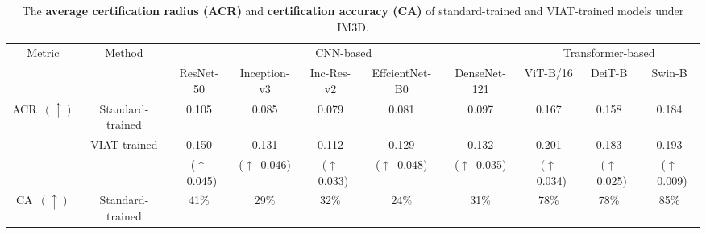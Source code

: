 \documentclass[10pt,journal,compsoc]{IEEEtran}
\begin{document}
\begin{table}[t]
\caption{The \textbf{average certification radius (ACR)} and \textbf{certification accuracy (CA)} of standard-trained and VIAT-trained models under IM3D.}
\setlength\tabcolsep{5.3pt}
\renewcommand\arraystretch{1.2}
\centering
\begin{tabular}{c|c|ccccc|ccc}
\hline
\multirow{2}{*}{Metric} & \multirow{2}{*}{Method}       & \multicolumn{5}{c|}{CNN-based}                                                                                                                                     & \multicolumn{3}{c}{Transformer-based}                                \\ \cline{3-10} 
                        &                               & \multicolumn{1}{c|}{ResNet-50} & \multicolumn{1}{c|}{Inception-v3} & \multicolumn{1}{c|}{Inc-Res-v2} & \multicolumn{1}{c|}{EffcientNet-B0} & DenseNet-121 & \multicolumn{1}{c|}{ViT-B/16} & \multicolumn{1}{c|}{DeiT-B} & Swin-B \\ \hline\hline
\multirow{3}{*}{ACR~$(\uparrow)$}    & Standard-trained              & \multicolumn{1}{c|}{0.105}          & \multicolumn{1}{c|}{0.085}             & \multicolumn{1}{c|}{0.079}                    & \multicolumn{1}{c|}{0.081}               & 0.097             & \multicolumn{1}{c|}{0.167}         & \multicolumn{1}{c|}{0.158}       & 0.184        \\ \cline{2-10} 
                        & \multirow{2}{*}{VIAT-trained} & \multicolumn{1}{c|}{0.150}          & \multicolumn{1}{c|}{0.131}             & \multicolumn{1}{c|}{0.112}                    & \multicolumn{1}{c|}{0.129}               & 0.132             & \multicolumn{1}{c|}{0.201}         & \multicolumn{1}{c|}{0.183}       & 0.193        \\
                        &                            & \multicolumn{1}{c|}{($\uparrow$~0.045) }          & \multicolumn{1}{c|}{($\uparrow$~0.046)}             & \multicolumn{1}{c|}{($\uparrow$~0.033)}                    & \multicolumn{1}{c|}{($\uparrow$~0.048)}               &  ($\uparrow$~0.035)            & \multicolumn{1}{c|}{($\uparrow$~0.034)}         & \multicolumn{1}{c|}{($\uparrow$~0.025)}       & ($\uparrow$~0.009)        \\ \hline
\multirow{3}{*}{CA~$(\uparrow)$}     & Standard-trained              & \multicolumn{1}{c|}{41\%}          & \multicolumn{1}{c|}{29\%}             & \multicolumn{1}{c|}{32\%}                    & \multicolumn{1}{c|}{24\%}               & 31\%            & \multicolumn{1}{c|}{78\%}         & \multicolumn{1}{c|}{78\%}       &85\%        \\ \cline{2-10} 

\end{tabular}
\end{table}
\end{document}
